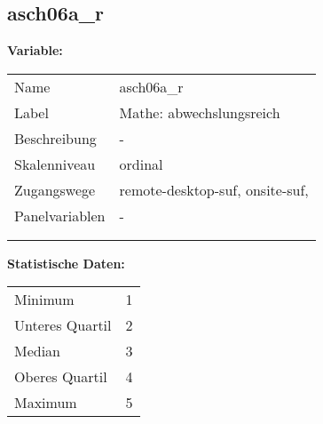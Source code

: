 	
	
	\subsection{asch06a\_r}
	\label{subSection:asch06a_r}

	\noindent\textbf{Variable:}\\
		\begin{tabular}{lL{11.3cm}}
			\label{tableVariable:asch06a_r}
			Name & asch06a\_r \\
			Label & Mathe: abwechslungsreich \\
			Beschreibung & - \\
			Skalenniveau & ordinal \\
			Zugangswege &
				remote-desktop-suf,
				onsite-suf,
 \\
			Panelvariablen & -
			 \\
			 \\
 \\
		\end{tabular}



		\vspace*{1 cm}
		\noindent\textbf{Statistische Daten:}\\
			\begin{tabular}{ll}
				\label{tableStatistics:asch06a_r}
					Minimum & 1 \\
					Unteres Quartil & 2 \\
					Median & 3 \\
					Oberes Quartil & 4 \\
					Maximum & 5 \\
			\end{tabular}



